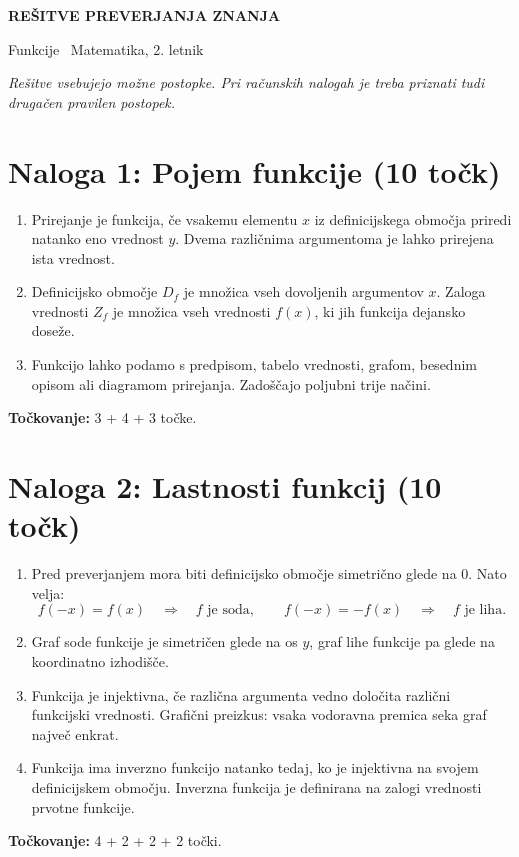 \documentclass[a4paper,12pt]{article}
\begin{document}
\begin{center}
	{\LARGE\bfseries\color{bordotemno} REŠITVE PREVERJANJA ZNANJA}\par
	\vspace{2mm}
	{\large Funkcije \textbar\ Matematika, 2. letnik}
\end{center}

\noindent\textit{Rešitve vsebujejo možne postopke. Pri računskih nalogah je treba priznati tudi drugačen pravilen postopek.}

\section*{Naloga 1: Pojem funkcije \hfill\normalfont\normalsize(10 točk)}
\begin{enumerate}[label=\arabic*)]
	\item Prirejanje je funkcija, če vsakemu elementu $x$ iz definicijskega območja priredi natanko eno vrednost $y$. Dvema različnima argumentoma je lahko prirejena ista vrednost.
	\item Definicijsko območje $D_f$ je množica vseh dovoljenih argumentov $x$. Zaloga vrednosti $Z_f$ je množica vseh vrednosti $f(x)$, ki jih funkcija dejansko doseže.
	\item Funkcijo lahko podamo s predpisom, tabelo vrednosti, grafom, besednim opisom ali diagramom prirejanja. Zadoščajo poljubni trije načini.
\end{enumerate}
\textbf{Točkovanje:} 3 + 4 + 3 točke.

\newpage
\section*{Naloga 2: Lastnosti funkcij \hfill\normalfont\normalsize(10 točk)}
\begin{enumerate}[label=\arabic*)]
	\item Pred preverjanjem mora biti definicijsko območje simetrično glede na $0$. Nato velja:
	\[
		f(-x)=f(x)\quad\Longrightarrow\quad f\text{ je soda},\qquad
		f(-x)=-f(x)\quad\Longrightarrow\quad f\text{ je liha}.
	\]
	\item Graf sode funkcije je simetričen glede na os $y$, graf lihe funkcije pa glede na koordinatno izhodišče.
	\item Funkcija je injektivna, če različna argumenta vedno določita različni funkcijski vrednosti. Grafični preizkus: vsaka vodoravna premica seka graf največ enkrat.
	\item Funkcija ima inverzno funkcijo natanko tedaj, ko je injektivna na svojem definicijskem območju. Inverzna funkcija je definirana na zalogi vrednosti prvotne funkcije.
\end{enumerate}
\textbf{Točkovanje:} 4 + 2 + 2 + 2 točki.
\end{document}
